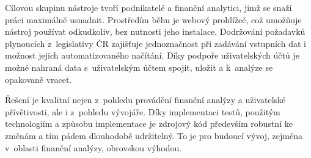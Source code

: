 Cílovou skupinu nástroje tvoří podnikatelé a finanční analytici, jimž se snaží práci maximálně usnadnit. Prostředím běhu je webový prohlížeč, což umožňuje nástroj používat odkudkoliv, bez nutnosti jeho instalace. Dodržování požadavků plynoucích z~legislativy ČR zajišťuje jednoznačnost při zadávání vstupních dat i možnost jejich automatizovaného načítání. Díky podpoře uživatelských účtů je možné nahraná data s~uživatelským účtem spojit, uložit a k~analýze se opakovaně vracet.

Řešení je kvalitní nejen z~pohledu provádění finanční analýzy a uživatelské přívětivosti, ale i z~pohledu vývojáře. Díky implementaci testů, použitým technologiím a způsobu implementace je zdrojový kód především robustní ke změnám a tím pádem dlouhodobě udržitelný. To je pro budoucí vývoj, zejména v~oblasti finanční analýzy, obrovskou výhodou.

